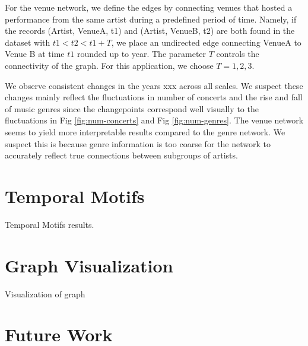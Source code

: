 \documentclass[9pt,twocolumn,twoside,lineno]{pnas-new}
\begin{document}
For the venue network, we define the edges by connecting venues that hosted a performance from the same artist during a predefined period of time. Namely, if the records (Artist, VenueA, t1) and  (Artist, VenueB, t2) are both found in the dataset with $t1 < t2 < t1 + T$, we place an undirected edge connecting VenueA to Venue B at time $t1$ rounded up to year. The parameter $T$ controls the connectivity of the graph. For this application, we choose $T = 1, 2, 3$. 

We observe consistent changes in the years xxx across all scales. We suspect these changes mainly reflect the fluctuations in number of concerts and the rise and fall of music genres since the changepoints correspond well visually to the fluctuations in Fig \ref{fig:num-concerts} and Fig \ref{fig:num-genres}.  The venue network seems to yield more interpretable results compared to the genre network. We suspect this is because genre information is too coarse for the network to accurately reflect true connections between subgroups of artists. 

\section{Temporal Motifs }
Temporal Motifs results.


\section{Graph Visualization }
Visualization of graph


\section{Future Work}


\end{document}
